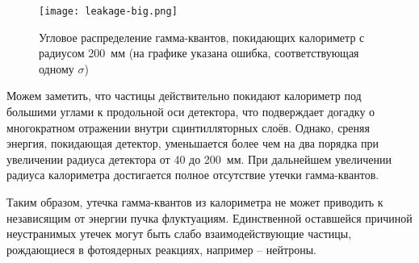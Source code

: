 \begin{figure}[H]
    \centering
    \texttt{[image: leakage-big.png]}
    \caption{Угловое распределение гамма-квантов, покидающих калориметр с радиусом \mbox{200 мм} (на графике указана ошибка, соответствующая одному $\sigma$)}
    \label{fig:leakBig}
\end{figure}

Можем заметить, что частицы действительно покидают калориметр под большими углами к продольной оси детектора, что подверждает догадку о многократном отражении внутри сцинтилляторных слоёв. Однако, среняя энергия, покидающая детектор, уменьшается более чем на два порядка при увеличении радиуса детектора от 40 до \mbox{200 мм}. При дальнейшем увеличении радиуса калориметра достигается полное отсутствие утечки гамма-квантов.

Таким образом, утечка гамма-квантов из калориметра не может приводить к независящим от энергии пучка флуктуациям. Единственной оставшейся причиной неустранимых утечек могут быть слабо взаимодействующие частицы, рождающиеся в фотоядерных реакциях, например -- нейтроны. 